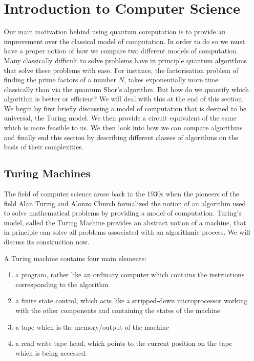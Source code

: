 \section{Introduction to Computer Science}
Our main motivation behind using quantum computation is to provide an improvement over the classical model of computation. In order to do so we must have a proper notion of how we compare two different models of computation. Many classically difficult to solve problems have in principle quantum algorithms that solve these problems with ease. For instance, the factorisation problem of finding the prime factors of a number $N$, takes exponentially more time classically than via the quantum Shor's algorithm. But how do we quantify which algorithm is better or efficient? We will deal with this at the end of this section. We begin by first briefly discussing a model of computation that is deemed to be universal, the Turing model. We then provide a circuit equivalent of the same which is more feasible to us. We then look into how we can compare algorithms and finally end this section by describing different classes of algorithms on the basis of their complexities.

\subsection{Turing Machines}
The field of computer science arose back in the 1930s when the pioneers of the field Alan Turing and Alonzo Church formalized the notion of an algorithm used to solve mathematical problems by providing a model of computation. Turing's model, called the Turing Machine provides an abstract notion of a machine, that in principle can solve all problems associated with an algorithmic process. We will discuss its construction now.

A Turing machine contains four main elements:
\begin{enumerate}
    \item a program, rather like an ordinary computer which contains the instructions corresponding to the algorithm
    \item a finite state control, which acts like a stripped-down microprocessor working with the other components and containing the states of the machine
    \item a tape which is the memory/output of the machine
    \item a read write tape head, which points to the current position on the tape which is being accessed.
\end{enumerate}

